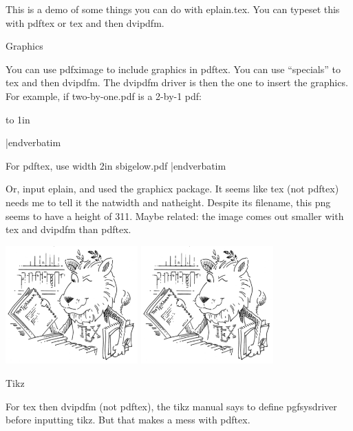
\beginpackages
  \usepackage{url}
  \usepackage{color}
  \usepackage{graphicx}
\endpackages

This is a demo of some things you can do with eplain.tex.  You can
typeset this with pdftex or tex and then dvipdfm.

\beginsection Graphics

You can use pdfximage to include graphics in pdftex.  You can use
``specials'' to tex and then dvipdfm.  The dvipdfm driver is then
the one to insert the graphics.  For example,
if two-by-one.pdf is a 2-by-1 pdf:

\verbatim
\vbox to 1in{\vss {}}
|endverbatim

For pdftex, use
\verbatim
\pdfximage width 2in {sbigelow.pdf} \pdfrefximage\pdflastximage
|endverbatim

Or, input eplain, and used the graphicx package.  It seems like tex (not
pdftex) needs me to tell it the natwidth and natheight.  Despite its
filename, this png seems to have a height of 311.  Maybe related: the
image comes out smaller with tex and dvipdfm than pdftex.

\ifpdf
\includegraphics[width=2in]{ctan_lion_350x350}
\else
\includegraphics[width=2in,natwidth=350,natheight=311]{ctan_lion_350x350.png}
\fi

\beginsection Tikz

For tex then dvipdfm (not pdftex), the tikz manual says to define
pgfsysdriver before inputting tikz.  But that makes a mess with
pdftex.

\ifpdf \else {} \fi


